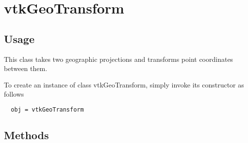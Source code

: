\section{vtkGeoTransform}

\subsection{Usage}

 This class takes two geographic projections and transforms point
 coordinates between them.

To create an instance of class vtkGeoTransform, simply
invoke its constructor as follows
\begin{verbatim}
  obj = vtkGeoTransform
\end{verbatim}
\subsection{Methods}

